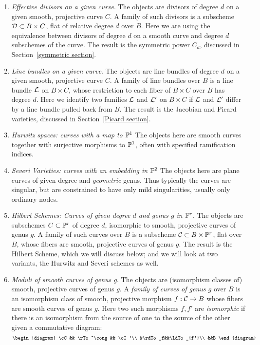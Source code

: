 \begin{enumerate}\label{list of moduli problems}

\item \emph{Effective divisors on a given curve}. The objects are divisors of degree $d$ on a given smooth, projective curve $C$. A family of such divisors is a subscheme ${\cal D} \subset B \times C$, flat of relative degree $d$ over $B$. Here we are using
the equivalence between divisors of degree $d$ on a smooth curve and degree $d$ subschemes of the curve. The result is the symmetric power $C_d$, discussed in Section~\ref{symmetric section}.

\item \emph{Line bundles on a given curve}. The objects are line bundles of degree $d$ on a given smooth, projective curve $C$. A family of line bundles over $B$ is a line bundle ${\mathcal L}$ on $B \times C$, whose restriction to each fiber of $B \times C$ over $B$ has degree $d$. Here we identify two families ${\mathcal L}$ and ${\mathcal L}'$ on $B \times C$ if ${\mathcal L}$ and ${\mathcal L}'$ differ by a line
bundle pulled back from $B$. The result is the Jacobian and Picard varieties, discussed in Section~\ref{Picard section}.

\item \emph{Hurwitz spaces: curves with a map to ${\mathbb P}^1$} The objects here are smooth curves
together with surjective morphisms to ${\mathbb P}^1$, often with specified ramification indices.

\item \emph{Severi Varieties: curves with an embedding in ${\mathbb P}^2$} The objects here are plane curves
of given degree and \emph{geometric} genus. Thus typically the curves are singular, but are
constrained to have only mild singularities, usually only ordinary nodes.

\item \emph{Hilbert Schemes: Curves of given degree $d$ and genus $g$ in ${\mathbb P}^r$}. The objects are subschemes $C \subset {\mathbb P}^r$ of degree $d$, isomorphic to smooth, projective curves of genus $g$. A family of such curves over $B$ is a subscheme ${\cal C} \subset B \times {\mathbb P}^r$, flat over $B$,  whose fibers are smooth, projective curves of genus $g$. The result is the Hilbert Scheme, which we will discuss below; and we will look at two variants, the Hurwitz and Severi schemes as well.

\item \emph{Moduli of smooth curves of genus $g$}. The objects are (isomorphism classes of) smooth, projective curves of genus $g$. A \emph{family of curves of genus $g$} over $B$ is an isomorphism class of smooth, projective morphism $f : {\cal C} \to B$ whose fibers are  smooth curves of genus $g$. Here two such morphisms $f, f'$
are \emph{isomorphic} if there is an isomorphism from the source of one to the source
of the other given a commutative diagram:
$$
\begin{diagram}
\cC && \rTo^\cong && \cC'\\
&\rdTo_f&&\ldTo_{f'}\\
&&B
\end{diagram}
$$

\end{enumerate}

